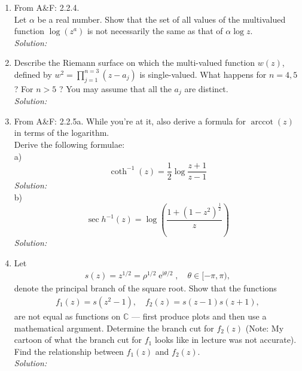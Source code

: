 \documentclass[10pt]{amsart}
\newcommand{\I}{\mathrm{i}}
\DeclareMathOperator{\E}{e}
\theoremstyle{nonumberplain}
\begin{document}
\begin{enumerate}[label={\bf {\arabic*}:}]
\item From A\&F: 2.2.4. \\
Let $\alpha$ be a real number.
Show that the set of all values of the multivalued function $\log(z^a)$ is not necessarily the same as that of $\alpha \log z$. \\
\textit{Solution:} \\
\item Describe the Riemann surface on which the multi-valued function
  $w(z)$, defined by $w^2=\prod_{j=1}^{n=3}\left(z-a_j\right)$ is
  single-valued. What happens for $n=4,5$ ? For $n>5$ ? You may assume
  that all the $a_j$ are distinct.\\
\textit{Solution:} \\
\item From A\&F: 2.2.5a. While you're at it, also derive a formula for $\operatorname{arccot}(z)$ in terms of the logarithm.\\
Derive the following formulae: \\
a) $$\coth^{-1}(z) = \frac{1}{2}\log\frac{z + 1}{z - 1}$$
\textit{Solution:} \\
b) $$\sec h^{-1}(z) = \log \left(\frac{1 + (1 - z^2)^{\frac{1}{2}}}{z}\right)$$
\textit{Solution:} \\

\item Let
  \begin{align*}
    s(z) = z^{1/2} = \rho^{1/2} \E^{\I \theta/2}, \quad \theta \in [-\pi,\pi),
  \end{align*}
  denote the principal branch of the square root.  Show that the
  functions
  \begin{align*}
    f_1(z) = s(z^2 -1), \quad f_2(z) = s(z-1) s(z+1),
  \end{align*}
  are not equal as functions on $\mathbb C$ --- first produce plots and then use a mathematical argument.  Determine the branch cut for $f_2(z)$ (Note: My
  cartoon of what the branch cut for $f_1$ looks like in lecture was
  not accurate).  Find the relationship between $f_1(z)$ and $f_2(z)$.\\
\textit{Solution:} \\


\end{enumerate}
\end{document}

